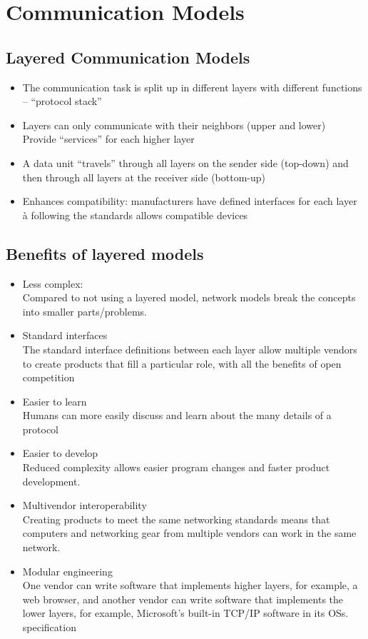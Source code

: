 \documentclass[11pt]{article}
\begin{document}
\section{Communication Models}
\subsection{Layered Communication Models}
    \begin{itemize}
        \item The communication task is split up in different layers with different functions – “protocol stack”
        \item Layers can only communicate with their neighbors (upper and lower) \\
        Provide “services” for each higher layer
        \item A data unit “travels” through all layers on the sender side (top-down) and then through all layers at the receiver side (bottom-up)
        \item Enhances compatibility: manufacturers have defined interfaces for each layer à following the standards allows compatible devices
    \end{itemize}
\subsection{Benefits of layered models}
\begin{itemize}
    \item Less complex: \\
    Compared to not using a layered model, network models break the concepts into smaller parts/problems.
    \item Standard interfaces \\
    The standard interface definitions between each layer allow multiple vendors to create products that fill a particular role, with all the benefits of open competition
    \item Easier to learn \\
    Humans can more easily discuss and learn about the many details of a protocol
    \item Easier to develop \\
    Reduced complexity allows easier program changes and faster product development.
    \item Multivendor interoperability \\
    Creating products to meet the same networking standards means that computers and networking gear from multiple vendors can work in the same network.
    \item Modular engineering \\
    One vendor can write software that implements higher layers, for example, a web browser, and another vendor can write software that implements the lower layers, for example, Microsoft's built-in TCP/IP software in its OSs.
specification
\end{itemize}
\end{document}
